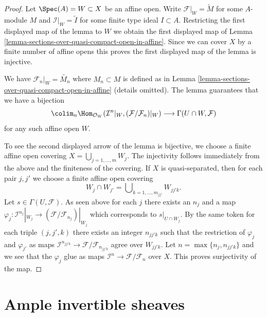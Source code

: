 \begin{proof}
Let $\Spec(A) = W \subset X$ be an affine open. Write
$\mathcal{F}|_W = \widetilde{M}$ for some $A$-module $M$
and $\mathcal{I}|_W = \widetilde{I}$ for some finite type
ideal $I \subset A$. Restricting the first displayed map
of the lemma to $W$ we obtain the first displayed map of
Lemma \ref{lemma-sections-over-quasi-compact-open-in-affine}.
Since we can cover $X$ by a finite number of affine opens this
proves the first displayed map of the lemma is injective.

\medskip\noindent
We have $\mathcal{F}_n|_W = \widetilde{M_n}$ where
$M_n \subset M$ is defined as in
Lemma \ref{lemma-sections-over-quasi-compact-open-in-affine}
(details omitted). The lemma guarantees that we have a bijection
$$
\colim_n  \Hom_{\mathcal{O}_W}(
\mathcal{I}^n|_W, (\mathcal{F}/\mathcal{F}_n)|_W)
\longrightarrow
\Gamma(U \cap W, \mathcal{F})
$$
for any such affine open $W$.

\medskip\noindent
To see the second displayed arrow of the lemma is bijective,
we choose a finite affine open covering $X = \bigcup_{j = 1, \ldots, m} W_j$.
The injectivity follows immediately from the above and the finiteness of
the covering. If $X$ is quasi-separated, then for each pair
$j, j'$ we choose a finite affine open covering
$$
W_j \cap W_{j'} = \bigcup\nolimits_{k = 1, \ldots, m_{jj'}} W_{jj'k}.
$$
Let $s \in \Gamma(U, \mathcal{F})$. As seen above for each $j$ there exists
an $n_j$ and a map
$\varphi_j : \mathcal{I}^{n_j}|_{W_j} \to
(\mathcal{F}/\mathcal{F}_{n_j})|_{W_j}$
which corresponds to $s|_{U \cap W_j}$.
By the same token for each triple $(j, j', k)$ there exists an integer
$n_{jj'k}$ such that the restriction of $\varphi_j$ and $\varphi_{j'}$
as maps $\mathcal{I}^{n_{jj'k}} \to \mathcal{F}/\mathcal{F}_{n_{jj'k}}$
agree over $W_{jj'k}$. Let $n = \max\{n_j, n_{jj'k}\}$ and we see that
the $\varphi_j$ glue as maps
$\mathcal{I}^n \to \mathcal{F}/\mathcal{F}_n$ over $X$.
This proves surjectivity of the map.
\end{proof}













\section{Ample invertible sheaves}
\label{section-ample}

